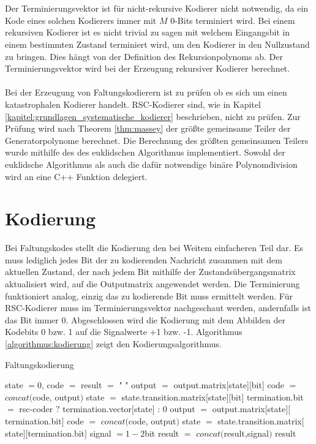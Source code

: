 \\
\\
Der Terminierungsvektor ist für nicht-rekursive Kodierer nicht notwendig, da ein Kode eines solchen Kodierers immer mit $M$ 0-Bits terminiert wird. Bei einem rekursiven Kodierer ist es nicht trivial zu sagen mit welchem Eingangsbit in einem bestimmten Zustand terminiert wird, um den Kodierer in den Nullzustand zu bringen. Dies hängt von der Definition des Rekursionpolynoms ab. Der Terminierungsvektor wird bei der Erzeugung rekursiver Kodierer berechnet.
\\
\\
Bei der Erzeugung von Faltungskodierern ist zu prüfen ob es sich um einen katastrophalen Kodierer handelt. RSC-Kodierer sind, wie in Kapitel \ref{kapitel:grundlagen_systematische_kodierer} beschrieben, nicht zu prüfen. Zur Prüfung wird nach Theorem \ref{thm:massey} der größte gemeinsame Teiler der Generatorpolynome berechnet. Die Berechnung des größten gemeinsamen Teilers wurde mithilfe des des euklidschen Algorithmus implementiert. Sowohl der euklidsche Algorithmus als auch die dafür notwendige binäre Polynomdivision wird an eine C++ Funktion delegiert.

\section{Kodierung}
\label{kapitel:implementierung_kodierung}
Bei Faltungskodes stellt die Kodierung den bei Weitem einfacheren Teil dar. Es muss lediglich jedes Bit der zu kodierenden Nachricht zusammen mit dem aktuellen Zustand, der nach jedem Bit mithilfe der Zustandsübergangsmatrix aktualisiert wird, auf die Outputmatrix angewendet werden. Die Terminierung funktioniert analog, einzig das zu kodierende Bit muss ermittelt werden. Für RSC-Kodierer muss im Terminierungsvektor nachgeschaut werden, andernfalls ist das Bit immer 0. Abgeschlossen wird die Kodierung mit dem Abbilden der Kodebits 0 bzw. 1 auf die Signalwerte +1 bzw. -1. Algorithmus \ref{algorithmus:kodierung} zeigt den Kodierungsalgorithmus.

\begin{algorithm}[H]
\renewcommand{\algorithmicforall}{\textbf{for each}}
\caption{Faltungskodierung}
\label{algorithmus:kodierung}
\begin{algorithmic}[1]
\STATE state $=0$, code $=$ result $=$ " "
   \STATE output $=$ output.matrix[state][bit]
	\STATE code $=$ $concat($code, output$)$
	\STATE state $=$ state.transition.matrix$[$state$][$bit$]$
\ENDFOR
{}
      \STATE termination.bit $=$ rsc-coder $?$ termination.vector$[$state$]$ : $0$
      \STATE output $=$ output.matrix$[$state$][$termination.bit$]$
	   \STATE code $=$ $concat($code, output$)$
	   \STATE state $=$ state.transition.matrix$[$state$][$termination.bit$]$
   \ENDFOR
\ENDIF
{}
   \STATE signal $=1-2$bit
   \STATE result $=$ $concat($result,signal$)$
\ENDFOR
\RETURN result
\end{algorithmic}
\end{algorithm}


